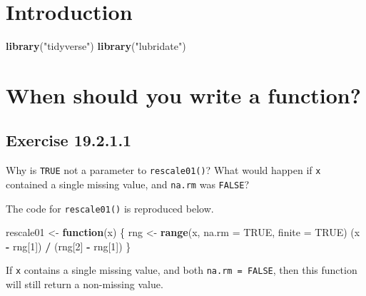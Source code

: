 \documentclass[]{book}
\newenvironment{Shaded}{\begin{snugshade}}{\end{snugshade}}
\newcommand{\ControlFlowTok}[1]{\textcolor[rgb]{0.13,0.29,0.53}{\textbf{#1}}}
\newcommand{\DataTypeTok}[1]{\textcolor[rgb]{0.13,0.29,0.53}{#1}}
\newcommand{\DecValTok}[1]{\textcolor[rgb]{0.00,0.00,0.81}{#1}}
\newcommand{\KeywordTok}[1]{\textcolor[rgb]{0.13,0.29,0.53}{\textbf{#1}}}
\newcommand{\NormalTok}[1]{#1}
\newcommand{\OperatorTok}[1]{\textcolor[rgb]{0.81,0.36,0.00}{\textbf{#1}}}
\newcommand{\OtherTok}[1]{\textcolor[rgb]{0.56,0.35,0.01}{#1}}
\newcommand{\StringTok}[1]{\textcolor[rgb]{0.31,0.60,0.02}{#1}}
\theoremstyle{plain}
\theoremstyle{remark}
\begin{document}
\hypertarget{introduction-12}{%
\section{Introduction}\label{introduction-12}}

\begin{Shaded}
\begin{Highlighting}[]
\KeywordTok{library}\NormalTok{(}\StringTok{"tidyverse"}\NormalTok{)}
\KeywordTok{library}\NormalTok{(}\StringTok{"lubridate"}\NormalTok{)}
\end{Highlighting}
\end{Shaded}

\hypertarget{when-should-you-write-a-function}{%
\section{When should you write a
function?}\label{when-should-you-write-a-function}}

\hypertarget{exercise-19.2.1.1}{%
\subsection*{\texorpdfstring{Exercise
{19.2.1.1}}{Exercise 19.2.1.1}}\label{exercise-19.2.1.1}}

Why is \texttt{TRUE} not a parameter to \texttt{rescale01()}? What would
happen if \texttt{x} contained a single missing value, and
\texttt{na.rm} was \texttt{FALSE}?

The code for \texttt{rescale01()} is reproduced below.

\begin{Shaded}
\begin{Highlighting}[]
\NormalTok{rescale01 <-}\StringTok{ }\ControlFlowTok{function}\NormalTok{(x) \{}
\NormalTok{  rng <-}\StringTok{ }\KeywordTok{range}\NormalTok{(x, }\DataTypeTok{na.rm =} \OtherTok{TRUE}\NormalTok{, }\DataTypeTok{finite =} \OtherTok{TRUE}\NormalTok{)}
\NormalTok{  (x }\OperatorTok{-}\StringTok{ }\NormalTok{rng[}\DecValTok{1}\NormalTok{]) }\OperatorTok{/}\StringTok{ }\NormalTok{(rng[}\DecValTok{2}\NormalTok{] }\OperatorTok{-}\StringTok{ }\NormalTok{rng[}\DecValTok{1}\NormalTok{])}
\NormalTok{\}}
\end{Highlighting}
\end{Shaded}

If \texttt{x} contains a single missing value, and both
\texttt{na.rm\ =\ FALSE}, then this function will still return a
non-missing value.
\end{document}

